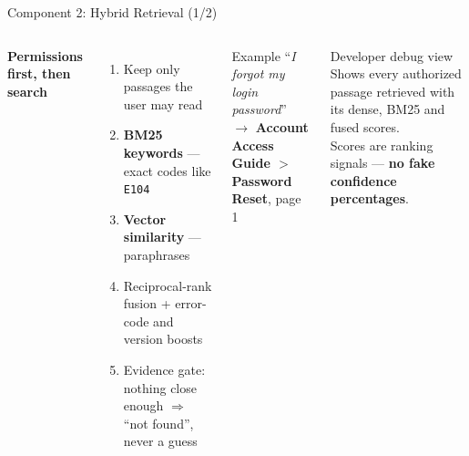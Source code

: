 \documentclass[aspectratio=169,11pt]{beamer}
\newcommand{\code}[1]{\texttt{\small #1}}
\begin{document}
\begin{frame}{Component 2: Hybrid Retrieval \hfill{\normalsize\color{white}(1/2)}}
  \begin{columns}[T]
      \textbf{Permissions first, then search}
      \begin{enumerate}\small
        \item Keep only passages the user may read
        \item \textbf{BM25 keywords} --- exact codes like \code{E104}
        \item \textbf{Vector similarity} --- paraphrases
        \item Reciprocal-rank fusion + error-code and version boosts
        \item Evidence gate: nothing close enough $\Rightarrow$ ``not found'', never a guess
      \end{enumerate}
      \begin{exampleblock}{Example}\small
        ``\textit{I forgot my login password}''\\
        $\rightarrow$ \textbf{Account Access Guide $>$ Password Reset}, page 1
      \end{exampleblock}
      \begin{block}{Developer debug view}\small
        Shows every authorized passage retrieved with its dense, BM25 and fused scores.\\[0.2em]
        Scores are ranking signals --- \textbf{no fake confidence percentages}.
      \end{block}
  \end{columns}
\end{frame}
\end{document}
